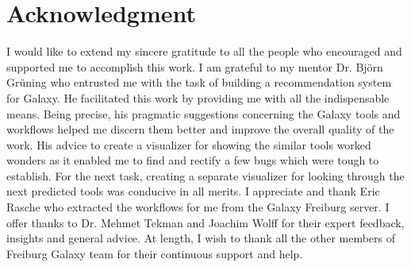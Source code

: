 \chapter*{Acknowledgment}

I would like to extend my sincere gratitude to all the people who encouraged and supported me to accomplish this work. I am grateful to my mentor Dr. Björn Grüning who entrusted me with the task of building a recommendation system for Galaxy. He facilitated this work by providing me with all the indispensable means. Being precise, his pragmatic suggestions concerning the Galaxy tools and workflows helped me discern them better and improve the overall quality of the work. His advice to create a visualizer for showing the similar tools worked wonders as it enabled me to find and rectify a few bugs which were tough to establish. For the next task, creating a separate visualizer for looking through the next predicted tools was conducive in all merits. I appreciate and thank Eric Rasche who extracted the workflows for me from the Galaxy Freiburg server. I offer thanks to Dr. Mehmet Tekman and Joachim Wolff for their expert feedback, insights and general advice. At length, I wish to thank all the other members of Freiburg Galaxy team for their continuous support and help.

